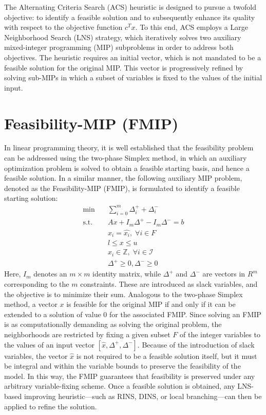 The Alternating Criteria Search (ACS) heuristic is designed to pursue a twofold objective: to identify a feasible solution and to subsequently enhance its quality with respect to the objective function $c^T x$. To this end, ACS employs a Large Neighborhood Search (LNS) strategy, which iteratively solves two auxiliary mixed-integer programming (MIP) subproblems in order to address both objectives.
The heuristic requires an initial vector, which is not mandated to be a feasible solution for the original MIP. This vector is progressively refined by solving sub-MIPs in which a subset of variables is fixed to the values of the initial input.
\section{Feasibility-MIP (FMIP)}
In linear programming theory, it is well established that the feasibility problem can be addressed using the two-phase Simplex method, in which an auxiliary optimization problem is solved to obtain a feasible starting basis, and hence a feasible solution.
In a similar manner, the following auxiliary MIP problem, denoted as the Feasibility-MIP (FMIP), is formulated to identify a feasible starting solution:
\begin{align*}
\text{min} \quad & \sum_{i=0}^m \Delta_i^{+}+\Delta_i^{-} \\ \text{s.t.} \quad & Ax + I_m\Delta^+ - I_m\Delta^- =b\\ & x_i = \hat{x_i}, \; \forall i \in F\\ & l \le x \le u\\ & x_i \in \mathbb{Z}, \; \forall i \in \mathcal{I} \\ & \Delta^+ \ge 0, \Delta^- \ge 0 
\end{align*} 
Here, $I_m$ denotes an $m \times m$ identity matrix, while $\Delta^+$ and $\Delta^-$ are vectors in $R^m$ corresponding to the $m$ constraints. These are introduced as slack variables, and the objective is to minimize their sum. 
Analogous to the two-phase Simplex method, a vector $x$ is feasible for the original MIP if and only if it can be extended to a solution of value $0$ for the associated FMIP. Since solving an FMIP is as computationally demanding as solving the original problem, the neighborhoods are restricted by fixing a given subset $F$ of the integer variables to the values of an input vector $[\hat{x}, \Delta^+, \Delta^-]$. Because of the introduction of slack variables, the vector $\hat{x}$ is not required to be a feasible solution itself, but it must be integral and within the variable bounds to preserve the feasibility of the model. In this way, the FMIP guarantees that feasibility is preserved under any arbitrary variable-fixing scheme. Once a feasible solution is obtained, any LNS-based improving heuristic—such as RINS\cite{RINS}, DINS\cite{DINS}, or local branching\cite{localBranching}—can then be applied to refine the solution.
